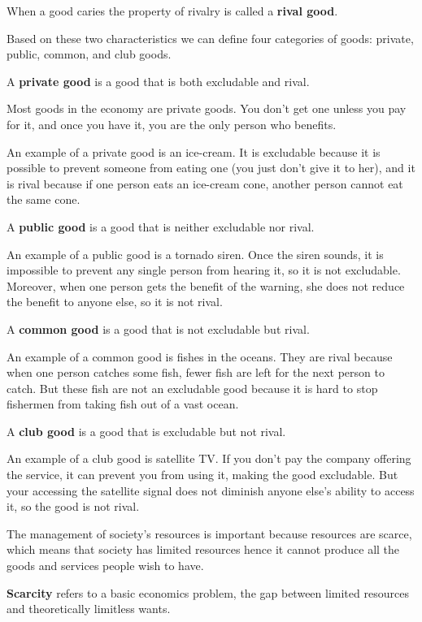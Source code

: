When a good caries the property of rivalry is called a \textbf{rival good}.
\ed

Based on these two characteristics we can define four categories of goods: private, public, common, and club goods.

A \textbf{private good} is a good that is both excludable and rival.
\ed

Most goods in the economy are private goods. You don't get one unless you pay for it, and once you have it, you are
the only person who benefits.

\be
An example of a private good is an ice-cream. It is excludable because it is possible to prevent someone from eating
one (you just don't give it to her), and it is rival because if one person eats an ice-cream cone, another person
cannot eat the same cone.
\ee

A \textbf{public good} is a good that is neither excludable nor rival.
\ed

\be
An example of a public good is a tornado siren. Once the siren sounds, it is impossible to prevent any single person
from hearing it, so it is not excludable. Moreover, when one person gets the benefit of the warning, she does not
reduce the benefit to anyone else, so it is not rival.
\ee

A \textbf{common good} is a good that is not excludable but rival.
\ed

\be
An example of a common good is fishes in the oceans. They are rival because when one person catches some fish, fewer
fish are left for the next person to catch. But these fish are not an excludable good because it is hard to stop
fishermen from taking fish out of a vast ocean.
\ee

A \textbf{club good} is a good that is excludable but not rival.
\ed

\be
An example of a club good is satellite TV. If you don't pay the company offering the service, it can prevent you from
using it, making the good excludable. But your accessing the satellite signal does not diminish anyone else's ability
to access it, so the good is not rival.
\ee

The management of society's resources is important because resources are scarce, which means that society has limited
resources hence it cannot produce all the goods and services people wish to have.

\bd[Scarcity]
\textbf{Scarcity} refers to a basic economics problem, the gap between limited resources and theoretically limitless
wants.
\ed

